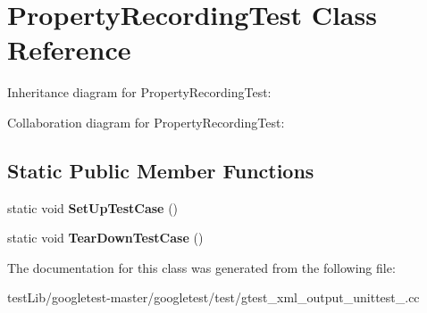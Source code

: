 \hypertarget{classPropertyRecordingTest}{}\section{Property\+Recording\+Test Class Reference}
\label{classPropertyRecordingTest}


Inheritance diagram for Property\+Recording\+Test\+:


Collaboration diagram for Property\+Recording\+Test\+:
\subsection*{Static Public Member Functions}
\begin{DoxyCompactItemize}
\item 
\mbox{\label{classPropertyRecordingTest_a673c9dfcd9f0c8d10d0df765852c1669}} 
static void {\bfseries Set\+Up\+Test\+Case} ()
\item 
\mbox{\label{classPropertyRecordingTest_ac0d2d47efbdc4399777dffca6071d15d}} 
static void {\bfseries Tear\+Down\+Test\+Case} ()
\end{DoxyCompactItemize}


The documentation for this class was generated from the following file\+:\begin{DoxyCompactItemize}
\item 
test\+Lib/googletest-\/master/googletest/test/gtest\+\_\+xml\+\_\+output\+\_\+unittest\+\_\+.\+cc\end{DoxyCompactItemize}
